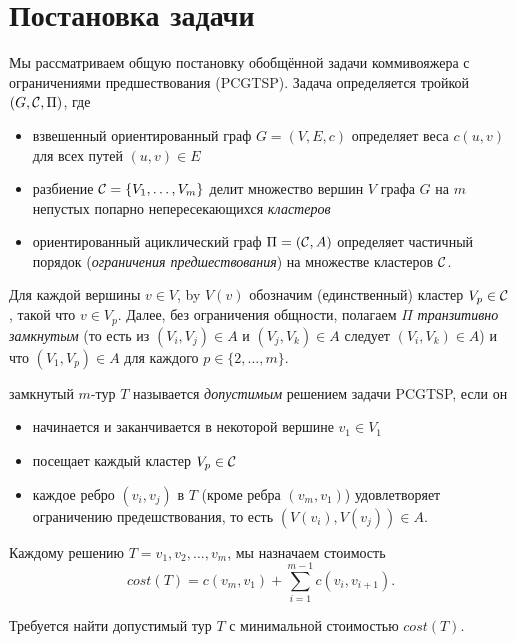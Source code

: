 \section{Постановка задачи}\label{sec:PS}
Мы рассматриваем общую постановку обобщённой задачи коммивояжера
с ограничениями предшествования
(PCGTSP). 
Задача определяется тройкой
$(G,\mathcal{C},\Pi)$, 
где
\begin{itemize}
	\item
	взвешенный ориентированный граф
	$G=(V,E,c)$
	определяет веса 
	$c(u,v)$
	для всех путей
	$(u,v)\in E$
	\item
	разбиение
	$\mathcal{C}=\{V_1,\ldots,V_m\}$
	делит множество вершин
	$V$ графа $G$ на $m$ 
	непустых попарно непересекающихся 
	{\it кластеров}
	\item
	ориентированный ациклический граф 
	$ \Pi = (\mathcal{C}, A) $ 
	определяет частичный порядок 
	(\textit{ограничения предшествования}) 
	на множестве кластеров $ \mathcal{C} $.
\end{itemize}

Для каждой вершины 
$v\in V$, by $V(v)$ 
обозначим (единственный) кластер 
$V_p\in\mathcal{C}$, 
такой что
$v\in V_p$. 
Далее,
без ограничения общности,
полагаем
$\Pi$ 
\textit{транзитивно замкнутым} 
(то есть из $(V_i,V_j)\in A$ и $(V_j,V_k)\in A$ следует $(V_i,V_k)\in A$) 
и что
$(V_1,V_p)\in A$ для каждого $p\in\{2,\ldots,m\}$.

замкнутый
$m$-тур $T$ 
называется \textit{допустимым} 
решением задачи PCGTSP, 
если он
\begin{itemize}
	\item
	начинается и заканчивается в некоторой вершине $v_1\in V_1$
	\item
	посещает каждый кластер $V_p\in\mathcal{C}$
	\item
	каждое ребро
	$(v_i, v_j)$ в $T$ 
	(кроме ребра $(v_m,v_1)$) 
	удовлетворяет ограничению предешствования,
	то есть
	 $(V(v_i),V(v_j))\in A$.
\end{itemize} 

Каждому решению
$T=v_1, v_2, \ldots, v_m$,
мы назначаем стоимость
$$
	cost(T) = c(v_m,v_1) + \sum_{i=1}^{m-1} c(v_i,v_{i+1}). 
$$ 

Требуется найти допустимый тур 
$ T $ 
с минимальной стоимостью $ cost (T) $.
